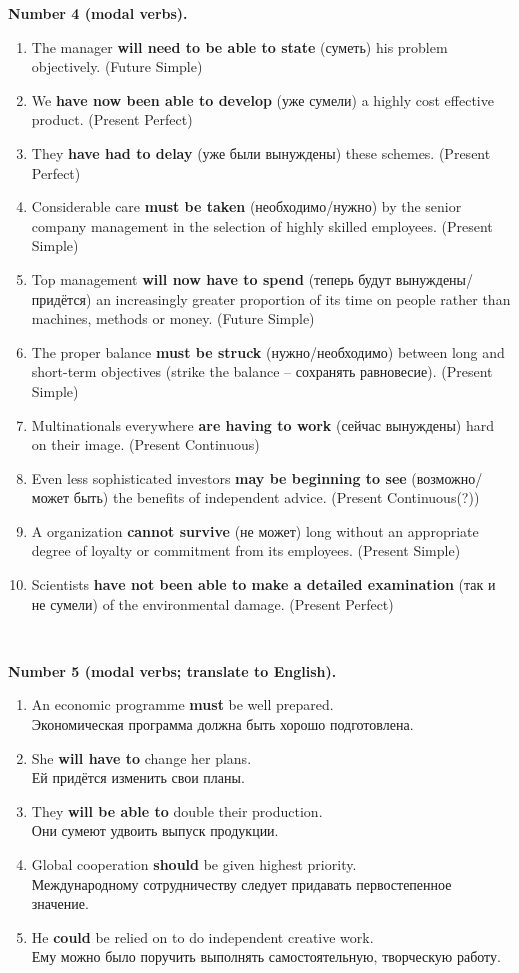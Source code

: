 \documentclass[main.tex]{subfiles}
\begin{document}
\textbf{Number 4 (modal verbs).}

\begin{enumerate}[nosep]
	\item The manager \textbf{will need to be able to state} (суметь) his problem objectively. (Future Simple)
	\item We \textbf{have now been able to develop} (уже сумели) a highly cost effective product. (Present Perfect)
	\item They \textbf{have had to delay} (уже были вынуждены) these schemes. (Present Perfect)
	\item Considerable care \textbf{must be taken} (необходимо/нужно) by the senior company management in the selection of highly skilled employees. (Present Simple)
	\item Top management \textbf{will now have to spend} (теперь будут вынуждены/придётся) an increasingly greater proportion of its time on people rather than machines, methods or money. (Future Simple)
	\item The proper balance \textbf{must be struck} (нужно/необходимо) between long and short-term objectives (strike the balance -- сохранять равновесие). (Present Simple)
	\item Multinationals everywhere \textbf{are having to work} (сейчас вынуждены) hard on their image. (Present Continuous)
	\item Even less sophisticated investors \textbf{may be beginning to see} (возможно/может быть) the benefits of independent advice. (Present Continuous(?))
	\item A organization \textbf{cannot survive} (не может) long without an appropriate degree of loyalty or commitment from its employees. (Present Simple)
	\item Scientists \textbf{have not been able to make a detailed examination} (так и не сумели) of the environmental damage. (Present Perfect)
\end{enumerate}
\

\textbf{Number 5 (modal verbs; translate to English).}

\begin{enumerate}[nosep]
	\item An economic programme \textbf{must} be well prepared.\\
	Экономическая программа должна быть хорошо подготовлена.
	\item She \textbf{will have to} change her plans.\\
	Ей придётся изменить свои планы.
	\item They \textbf{will be able to} double their production.\\
	Они сумеют удвоить выпуск продукции.
	\item Global cooperation \textbf{should} be given highest priority.\\
	Международному сотрудничеству следует придавать первостепенное значение.
	\item He \textbf{could} be relied on to do independent creative work.\\
	Ему можно было поручить выполнять самостоятельную, творческую работу.
\end{enumerate}
\end{document}
